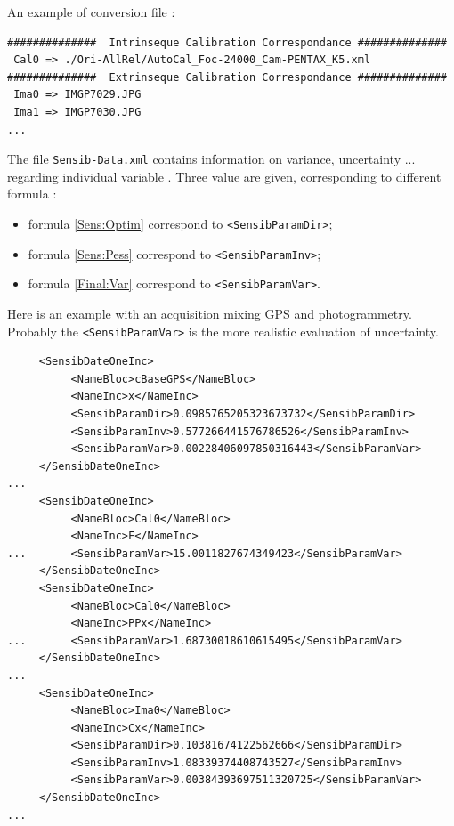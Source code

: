 An example of conversion file :

\begin{verbatim}
##############  Intrinseque Calibration Correspondance ##############
 Cal0 => ./Ori-AllRel/AutoCal_Foc-24000_Cam-PENTAX_K5.xml
##############  Extrinseque Calibration Correspondance ##############
 Ima0 => IMGP7029.JPG
 Ima1 => IMGP7030.JPG
...
\end{verbatim}

The file {\tt Sensib-Data.xml} contains information on  variance, uncertainty  ...
regarding individual variable . Three value are given, corresponding
to different formula  :

\begin{itemize}
    \item formula \ref{Sens:Optim}  correspond to {\tt <SensibParamDir>};
    \item formula \ref{Sens:Pess}   correspond to {\tt <SensibParamInv>};
    \item formula \ref{Final:Var}   correspond to {\tt <SensibParamVar>}.
\end{itemize}

Here is an example with an acquisition mixing GPS and photogrammetry. Probably the
 {\tt <SensibParamVar>} is the more realistic evaluation of uncertainty.

\begin{verbatim}
     <SensibDateOneInc>
          <NameBloc>cBaseGPS</NameBloc>
          <NameInc>x</NameInc>
          <SensibParamDir>0.0985765205323673732</SensibParamDir>
          <SensibParamInv>0.577266441576786526</SensibParamInv>
          <SensibParamVar>0.00228406097850316443</SensibParamVar>
     </SensibDateOneInc>
...
     <SensibDateOneInc>
          <NameBloc>Cal0</NameBloc>
          <NameInc>F</NameInc>
...       <SensibParamVar>15.0011827674349423</SensibParamVar>
     </SensibDateOneInc>
     <SensibDateOneInc>
          <NameBloc>Cal0</NameBloc>
          <NameInc>PPx</NameInc>
...       <SensibParamVar>1.68730018610615495</SensibParamVar>
     </SensibDateOneInc>
...
     <SensibDateOneInc>
          <NameBloc>Ima0</NameBloc>
          <NameInc>Cx</NameInc>
          <SensibParamDir>0.10381674122562666</SensibParamDir>
          <SensibParamInv>1.08339374408743527</SensibParamInv>
          <SensibParamVar>0.00384393697511320725</SensibParamVar>
     </SensibDateOneInc>
...
\end{verbatim}


